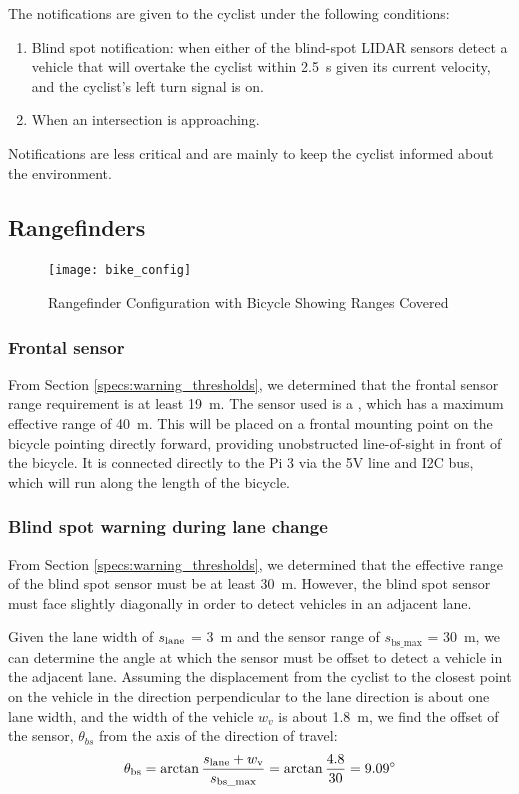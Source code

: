 \documentclass[journal]{IEEEtran}
\begin{document}
The notifications are given to the cyclist under the following conditions:

\begin{enumerate}
    \item Blind spot notification: when either of the blind-spot LIDAR sensors detect a vehicle that will overtake the cyclist within \SI{2.5}{\s} given its current velocity, and the cyclist's left turn signal is on.
    \item When an intersection is approaching.
\end{enumerate}

Notifications are less critical and are mainly to keep the cyclist informed about the environment.

\subsection{Rangefinders}
\begin{figure}
    \centering
    \texttt{[image: bike\_config]}
    \caption{Rangefinder Configuration with Bicycle Showing Ranges Covered}
    \label{fig:bike_config}
\end{figure}
\subsubsection{Frontal sensor}
From Section \ref{specs:warning_thresholds}, we determined that the frontal sensor range requirement is at least \SI{19}{\meter}. The sensor used is a \lidar{}, which has a maximum effective range of \SI{40}{\meter}. This will be placed on a frontal mounting point on the bicycle pointing directly forward, providing unobstructed line-of-sight in front of the bicycle. It is connected directly to the Pi 3 via the 5V line and I2C bus, which will run along the length of the bicycle.

\subsubsection{Blind spot warning during lane change}
\label{sys:bswarning}
From Section \ref{specs:warning_thresholds}, we determined that the effective range of the blind spot sensor must be at least \SI{30}{\meter}. However, the blind spot sensor must face slightly diagonally in order to detect vehicles in an adjacent lane.

Given the lane width of $s_\text{lane}$ = \SI{3}{\meter} and the sensor range of $s_{\text{bs\_max}}$ = \SI{30}{\meter}, we can determine the angle at which the sensor must be offset to detect a vehicle in the adjacent lane. Assuming the displacement from the cyclist to the closest point on the vehicle in the direction perpendicular to the lane direction is about one lane width, and the width of the vehicle $w_v$ is about \SI{1.8}{\meter}, we find the offset of the sensor, $\theta_{bs}$ from the axis of the direction of travel:
\begin{equation}
\theta_\text{bs} 
    = \arctan{\frac{s_\text{lane}+ w_\text{v}}{s_\text{bs\_max}}}
    = \arctan{\frac{4.8}{30}} 
    = \ang{9.09}
\end{equation}
\end{document}

